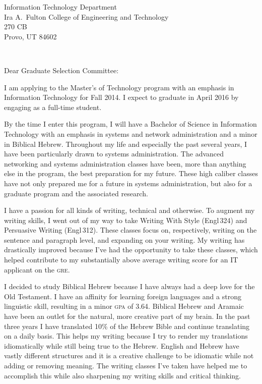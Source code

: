 \documentclass{letter}
\makeatletter
\def\opening#1{\ifx\@empty\fromaddress
  \thispagestyle{firstpage}%
    {\raggedleft\@date\par}%
  \else  %
    \thispagestyle{empty}%
    {\noindent\let\\\cr\halign{##\hfil\cr\ignorespaces
      \fromaddress \cr\noalign{\kern 2\parskip}%
      \@date\cr}\par}%
  \fi
  \vspace{2\parskip}%
  {\raggedright \toname \\ \toaddress \par}%
  \vspace{2\parskip}%
  #1\par\nobreak}
\makeatother
\begin{document}
\begin{letter}{Information Technology Department \\ Ira A.\ Fulton College of Engineering and Technology \\ 270 CB \\ Provo, UT 84602}
\opening{Dear Graduate Selection Committee:}

I am applying to the Master's of Technology program with an emphasis in Information Technology for Fall 2014. I expect to graduate in April 2016 by engaging as a full-time student.

By the time I enter this program, I will have a Bachelor of Science in Information Technology with an emphasis in systems and network administration and a minor in Biblical Hebrew. Throughout my life and especially the past several years, I have been particularly drawn to systems administration. The advanced networking and systems administration classes have been, more than anything else in the program, the best preparation for my future. These high caliber classes have not only prepared me for a future in systems administration, but also for a graduate program and the associated research.

I have a passion for all kinds of writing, technical and otherwise. To augment my writing skills, I went out of my way to take Writing With Style (Engl\,324) and Persuasive Writing (Engl\,312). These classes focus on, respectively, writing on the sentence and paragraph level, and expanding on your writing. My writing has drastically improved because I've had the opportunity to take these classes, which helped contribute to my substantially above average writing score for an IT applicant on the \textsc{g\hspace*{0.05em}r\hspace*{0.05em}e}.

I decided to study Biblical Hebrew because I have always had a deep love for the Old Testament. I have an affinity for learning foreign languages and a strong linguistic skill, resulting in a minor \textsc{g\hspace*{0.05em}p\hspace*{0.05em}a} of 3.64. Biblical Hebrew and Aramaic have been an outlet for the natural, more creative part of my brain. In the past three years I have translated 10\% of the Hebrew Bible and continue translating on a daily basis. This helps my writing because I try to render my translations idiomatically while still being true to the Hebrew. English and Hebrew have vastly different structures and it is a creative challenge to be idiomatic while not adding or removing meaning. The writing classes I've taken have helped me to accomplish this while also sharpening my writing skills and critical thinking.


\end{letter}
\end{document}
